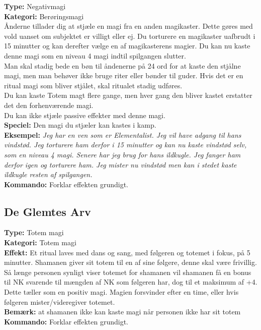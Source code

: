 \begin{meditation*}
\textbf{Type:} Negativmagi \\
\textbf{Kategori:} Berøringsmagi\\
Ånderne tillader dig at stjæle en magi fra en anden magikaster. Dette gøres med vold uanset om subjektet er villigt eller ej. Du torturere en magikaster uafbrudt i 15 minutter og kan derefter vælge en
af magikasterens magier. Du kan nu kaste denne magi som en niveau 4 magi indtil spilgangen slutter.\\
Man skal stadig bede en bøn til åndenerne på 24 ord for at kaste den stjålne magi, men man behøver ikke bruge riter eller bønder til guder. Hvis det er en ritual magi som bliver stjålet, skal ritualet stadig udføres.\\
Du kan kaste Totem magt flere gange, men hver gang den bliver kastet erstatter det den
forhenværende magi.\\
Du kan ikke stjæle passive effekter med denne magi.\\
\textbf{Speciel:} Den magi du stjæler kan kastes i kamp.\\
\textbf{Eksempel:} \textit{Jeg har en ven som er Elementalist. Jeg vil have adgang til hans vindstød. Jeg torturere ham derfor i 15 minutter og kan nu kaste vindstød selv, som en niveau 4 magi. Senere har jeg brug for
hans ildkugle. Jeg fanger ham derfor igen og torturere ham. Jeg mister nu vindstød men kan i stedet kaste ildkugle resten af spilgangen.}\\
\textbf{Kommando:} Forklar effekten grundigt.
\end{meditation*}

\subsection{De Glemtes Arv}

\begin{orleks arv*}
\textbf{Type:} Totem magi\\
\textbf{Kategori:} Totem magi\\
\textbf{Effekt:} Et ritual laves med dans og sang, med følgeren og totemet i fokus, på 5 minutter.
Shamanen giver sit totem til en af sine følgere, denne skal være frivillig. Så længe personen synligt viser totemet for shamanen vil shamanen få en bonus til NK svarende til mængden af NK som følgeren har, dog til et maksimum af +4. Dette tæller som en positiv magi. Magien forsvinder efter en time, eller hvis følgeren mister/videregiver totemet.\\ 
\textbf{Bemærk:} at shamanen ikke kan kaste magi når personen ikke har sit totem
\textbf{Kommando:} Forklar effekten grundigt.
\end{orleks arv*}

